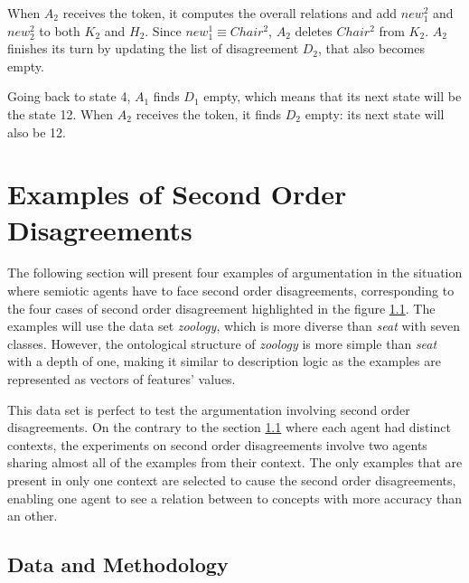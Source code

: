 When $A_{2}$ receives the token, it computes the overall relations and add $new_1^{2}$ and $new_2^{2}$ to both $K_{2}$ and $H_{2}$. Since $new_1^{1} \equiv Chair^{2}$, $A_{2}$ deletes $Chair^{2}$ from $K_{2}$. $A_{2}$ finishes its turn by updating the list of disagreement $D_{2}$, that also becomes empty.

Going back to state 4, $A_{1}$ finds $D_{1}$ empty, which means that its next state will be the state 12. When $A_{2}$ receives the token, it finds $D_{2}$ empty: its next state will also be 12.



\section{Examples of Second Order Disagreements}

The following section will present four examples of argumentation in the situation where semiotic agents have to face second order disagreements, corresponding to the four cases of second order disagreement highlighted in the figure \ref{}. The examples will use the data set \emph{zoology}, which is more diverse than \emph{seat} with seven classes. However, the ontological structure of \emph{zoology} is more simple than \emph{seat} with a depth of one, making it similar to description logic as the examples are represented as vectors of features' values.

This data set is perfect to test the argumentation involving second order disagreements. On the contrary to the section \ref{} where each agent had distinct contexts, the experiments on second order disagreements involve two agents sharing almost all of the examples from their context. The only examples that are present in only one context are selected to cause the second order disagreements, enabling one agent to see a relation between to concepts with more accuracy than an other. 

\subsection{Data and Methodology}

